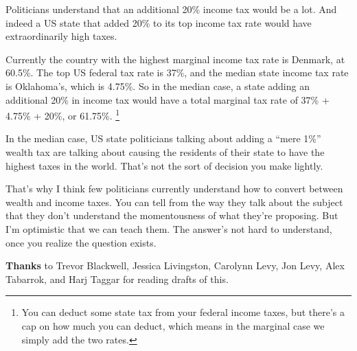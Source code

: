 Politicians understand that an additional 20\% income tax would be a
lot. And indeed a US state that added 20\% to its top income tax rate
would have extraordinarily high taxes.

Currently the country with the highest marginal income tax rate is
Denmark, at 60.5\%. The top US federal tax rate is 37\%, and the median
state income tax rate is Oklahoma's, which is 4.75\%. So in the median
case, a state adding an additional 20\% in income tax would have a total
marginal tax rate of 37\% + 4.75\% + 20\%, or 61.75\%.
\footnote{You can deduct some state tax from your federal income taxes,
but there's a cap on how much you can deduct, which means in the
marginal case we simply add the two rates.}

In the median case, US state politicians talking about adding a ``mere
1\%'' wealth tax are talking about causing the residents of their state
to have the highest taxes in the world. That's not the sort of decision
you make lightly.

That's why I think few politicians currently understand how to convert
between wealth and income taxes. You can tell from the way they talk
about the subject that they don't understand the momentousness of what
they're proposing. But I'm optimistic that we can teach them. The
answer's not hard to understand, once you realize the question exists.


\textbf{Thanks} to Trevor Blackwell, Jessica Livingston, Carolynn Levy,
Jon Levy, Alex Tabarrok, and Harj Taggar for reading drafts of this.